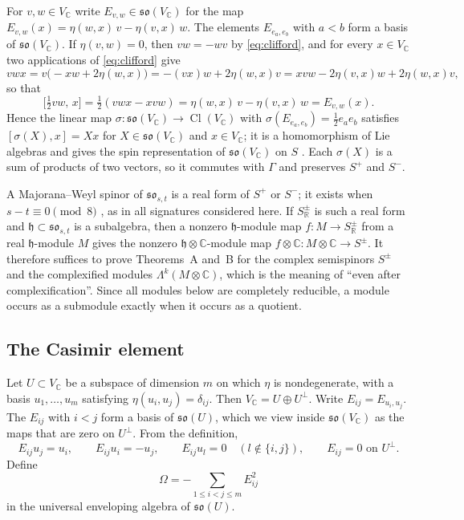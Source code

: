 \documentclass[11pt]{amsart}
\theoremstyle{remark}
\newcommand{\so}{\mathfrak{so}}
\newcommand{\h}{\mathfrak{h}}
\newcommand{\R}{\mathbb{R}}
\newcommand{\C}{\mathbb{C}}
\DeclareMathOperator{\Cl}{Cl}
\begin{document}
For $v,w\in V_\C$ write $E_{v,w}\in\so(V_\C)$ for the map $E_{v,w}(x)=\eta(w,x)\,v-\eta(v,x)\,w$. The elements $E_{e_a,e_b}$ with $a<b$ form a basis of $\so(V_\C)$. If $\eta(v,w)=0$, then $vw=-wv$ by \eqref{eq:clifford}, and for every $x\in V_\C$ two applications of \eqref{eq:clifford} give
\[
vwx=v\bigl(-xw+2\eta(w,x)\bigr)=-(vx)w+2\eta(w,x)v=xvw-2\eta(v,x)w+2\eta(w,x)v,
\]
so that
\begin{equation}\label{eq:spinrep}
\bigl[\tfrac12vw,\,x\bigr]=\tfrac12(vwx-xvw)=\eta(w,x)\,v-\eta(v,x)\,w=E_{v,w}(x).
\end{equation}
Hence the linear map $\sigma:\so(V_\C)\to\Cl(V_\C)$ with $\sigma(E_{e_a,e_b})=\tfrac12e_ae_b$ satisfies $[\sigma(X),x]=Xx$ for $X\in\so(V_\C)$ and $x\in V_\C$; it is a homomorphism of Lie algebras and gives the spin representation of $\so(V_\C)$ on $S$ \cite[Ch.~I, \S 6]{LM89}. Each $\sigma(X)$ is a sum of products of two vectors, so it commutes with $\Gamma$ and preserves $S^+$ and $S^-$.

A Majorana--Weyl spinor of $\so_{s,t}$ is a real form of $S^+$ or $S^-$; it exists when $s-t\equiv0\pmod 8$ \cite[Ch.~I, \S\S 4--5]{LM89}, as in all signatures considered here. If $S^\pm_\R$ is such a real form and $\h\subset\so_{s,t}$ is a subalgebra, then a nonzero $\h$-module map $f:M\to S^\pm_\R$ from a real $\h$-module $M$ gives the nonzero $\h\otimes\C$-module map $f\otimes\C:M\otimes\C\to S^\pm$. It therefore suffices to prove Theorems~A and~B for the complex semispinors $S^\pm$ and the complexified modules $\Lambda^k(M\otimes\C)$, which is the meaning of ``even after complexification''. Since all modules below are completely reducible, a module occurs as a submodule exactly when it occurs as a quotient.

\subsection{The Casimir element}
Let $U\subset V_\C$ be a subspace of dimension $m$ on which $\eta$ is nondegenerate, with a basis $u_1,\dots,u_m$ satisfying $\eta(u_i,u_j)=\delta_{ij}$. Then $V_\C=U\oplus U^\perp$. Write $E_{ij}=E_{u_i,u_j}$. The $E_{ij}$ with $i<j$ form a basis of $\so(U)$, which we view inside $\so(V_\C)$ as the maps that are zero on $U^\perp$. From the definition,
\begin{equation}\label{eq:Eaction}
E_{ij}u_j=u_i,\qquad E_{ij}u_i=-u_j,\qquad E_{ij}u_l=0\quad(l\notin\{i,j\}),\qquad E_{ij}=0\text{ on }U^\perp.
\end{equation}
Define
\begin{equation}\label{eq:casimir}
\Omega=-\sum_{1\le i<j\le m}E_{ij}^2
\end{equation}
in the universal enveloping algebra of $\so(U)$.
\end{document}
